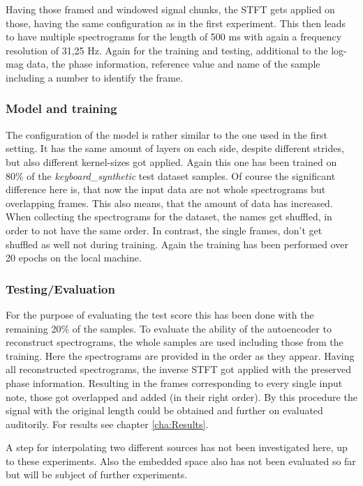 Having those framed and windowed signal chunks, the STFT gets applied on those, having the same configuration as in the first experiment. This then leads to have multiple spectrograms for the length of 500 ms with again a frequency resolution of 31,25 Hz. Again for the training and testing, additional to the log-mag data, the phase information, reference value and name of the sample including a number to identify the frame.

\subsubsection{Model and training}
The configuration of the model is rather similar to the one used in the first setting. It has the same amount of layers on each side, despite different strides, but also different kernel-sizes got applied. Again this one has been trained on 80\% of the \textit{keyboard\_synthetic} test dataset samples. Of course the significant difference here is, that now the input data are not whole spectrograms but overlapping frames. This also means, that the amount of data has increased. When collecting the spectrograms for the dataset, the names get shuffled, in order to not have the same order. In contrast, the single frames, don't get shuffled as well not during training. Again the training has been performed over 20 epochs on the local machine.

\subsubsection{Testing/Evaluation}
For the purpose of evaluating the test score this has been done with the remaining 20\% of the samples. To evaluate the ability of the autoencoder to reconstruct spectrograms, the whole samples are used including those from the training. Here the spectrograms are provided in the order as they appear. Having all reconstructed spectrograms, the inverse STFT got applied with the preserved phase information. Resulting in the frames corresponding to every single input note, those got overlapped and added (in their right order). By this procedure the signal with the original length could be obtained and further on evaluated auditorily. For results see chapter \ref{cha:Results}. 

A step for interpolating two different sources has not been investigated here, up to these experiments. Also the embedded space also has not been evaluated so far but will be subject of further experiments.

